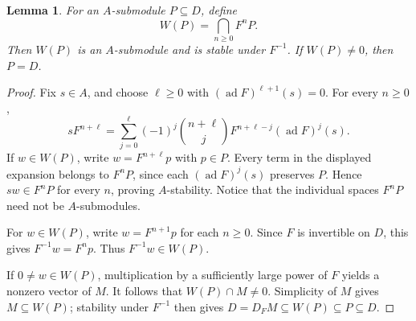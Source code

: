 \documentclass[11pt,a4paper]{article}
\newcommand{\ad}{\operatorname{ad}}
\theoremstyle{plainupright}
\newtheorem{lemma}[theorem]{Lemma}
\begin{document}
\begin{lemma}\label{lem:divisible}
For an \(A\)-submodule \(P\subseteq D\), define
\[
W(P)=\bigcap_{n\ge0}F^nP.
\]
Then \(W(P)\) is an \(A\)-submodule and is stable under \(F^{-1}\).
If \(W(P)\ne0\), then \(P=D\).
\end{lemma}
\begin{proof}
Fix \(s\in A\), and choose \(\ell\ge0\) with
\((\ad F)^{\ell+1}(s)=0\). For every \(n\ge0\),
\[
sF^{n+\ell}
=\sum_{j=0}^{\ell}(-1)^j\binom{n+\ell}{j}
F^{n+\ell-j}(\ad F)^j(s).
\]
If \(w\in W(P)\), write \(w=F^{n+\ell}p\) with \(p\in P\).
Every term in the displayed expansion belongs to \(F^nP\), since
each \((\ad F)^j(s)\) preserves \(P\).
Hence \(sw\in F^nP\) for every \(n\), proving \(A\)-stability.
Notice that the individual spaces \(F^nP\) need not be \(A\)-submodules.

For \(w\in W(P)\), write \(w=F^{n+1}p\) for each \(n\ge0\).
Since \(F\) is invertible on \(D\), this gives \(F^{-1}w=F^np\).
Thus \(F^{-1}w\in W(P)\).

If \(0\ne w\in W(P)\), multiplication by a sufficiently large power
of \(F\) yields a nonzero vector of \(M\). It follows that
\(W(P)\cap M\ne0\). Simplicity of \(M\) gives \(M\subseteq W(P)\);
stability under \(F^{-1}\) then gives
\(D=D_FM\subseteq W(P)\subseteq P\subseteq D\).
\end{proof}
\end{document}
